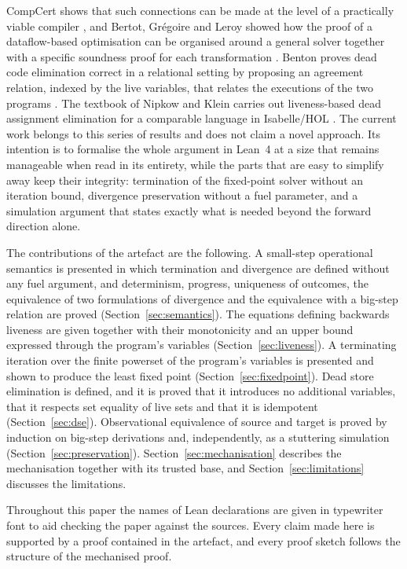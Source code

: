 \documentclass[11pt,a4paper]{article}
\theoremstyle{plain}
\theoremstyle{definition}
\theoremstyle{remark}
\begin{document}
CompCert shows that such connections can be made at the level of a practically viable compiler \cite{Leroy2006popl,Leroy2009cacm,Leroy2009jar}, and Bertot, Gr\'egoire and Leroy showed how the proof of a dataflow-based optimisation can be organised around a general solver together with a specific soundness proof for each transformation \cite{BertotGregoireLeroy2006}. Benton proves dead code elimination correct in a relational setting by proposing an agreement relation, indexed by the live variables, that relates the executions of the two programs \cite{Benton2004}. The textbook of Nipkow and Klein carries out liveness-based dead assignment elimination for a comparable language in Isabelle/HOL \cite{NipkowKlein2014}. The current work belongs to this series of results and does not claim a novel approach. Its intention is to formalise the whole argument in Lean~4 \cite{MouraUllrich2021} at a size that remains manageable when read in its entirety, while the parts that are easy to simplify away keep their integrity: termination of the fixed-point solver without an iteration bound, divergence preservation without a fuel parameter, and a simulation argument that states exactly what is needed beyond the forward direction alone.

The contributions of the artefact are the following. A small-step operational semantics is presented in which termination and divergence are defined without any fuel argument, and determinism, progress, uniqueness of outcomes, the equivalence of two formulations of divergence and the equivalence with a big-step relation are proved (Section~\ref{sec:semantics}). The equations defining backwards liveness are given together with their monotonicity and an upper bound expressed through the program's variables (Section~\ref{sec:liveness}). A terminating iteration over the finite powerset of the program's variables is presented and shown to produce the least fixed point (Section~\ref{sec:fixedpoint}). Dead store elimination is defined, and it is proved that it introduces no additional variables, that it respects set equality of live sets and that it is idempotent (Section~\ref{sec:dse}). Observational equivalence of source and target is proved by induction on big-step derivations and, independently, as a stuttering simulation (Section~\ref{sec:preservation}). Section~\ref{sec:mechanisation} describes the mechanisation together with its trusted base, and Section~\ref{sec:limitations} discusses the limitations.

Throughout this paper the names of Lean declarations are given in typewriter font to aid checking the paper against the sources. Every claim made here is supported by a proof contained in the artefact, and every proof sketch follows the structure of the mechanised proof.
\end{document}
